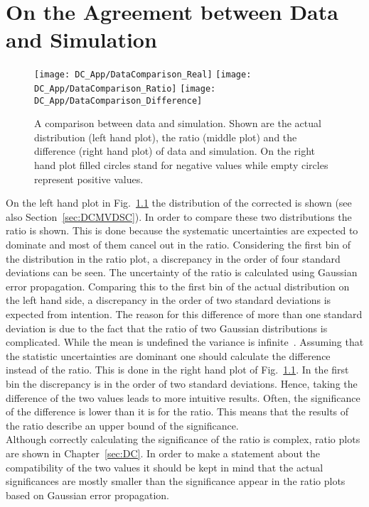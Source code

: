 \chapter{On the Agreement between Data and Simulation \label{sec:DCPvalue}}

\begin{figure}[!h]
  \centering
  \texttt{[image: DC\_App/DataComparison\_Real]}
  \texttt{[image: DC\_App/DataComparison\_Ratio]}
  \texttt{[image: DC\_App/DataComparison\_Difference]}
\caption[Comparison between data and simulation: Actual distributions, ratio and difference]{A comparison between data and simulation. Shown are the actual distribution (left hand plot), the ratio (middle plot) and the difference (right hand plot) of data and simulation. On the right hand plot filled circles stand for negative values while empty circles represent positive values. \label{plot:DCPvalue}}
\end{figure}

On the left hand plot in Fig.~\ref{plot:DCPvalue} the distribution of the corrected \MET{} is shown (see also Section~\ref{sec:DCMVDSC}). In order to compare these two distributions the ratio is shown. This is done because the systematic uncertainties are expected to dominate and most of them cancel out in the ratio. Considering the first bin of the distribution in the ratio plot, a discrepancy in the order of four standard deviations can be seen. The uncertainty of the ratio is calculated using Gaussian error propagation. Comparing this to the first bin of the actual distribution on the left hand side, a discrepancy in the order of two standard deviations is expected from intention. The reason for this difference of more than one standard deviation is due to the fact that the ratio of two Gaussian distributions is complicated. While the mean is undefined the variance is infinite~\cite{ratioMail}. Assuming that the statistic uncertainties are dominant one should calculate the difference instead of the ratio. This is done in the right hand plot of Fig.~\ref{plot:DCPvalue}. In the first bin the discrepancy is in the order of two standard deviations. Hence, taking the difference of the two values leads to more intuitive results. Often, the significance of the difference is lower than it is for the ratio. This means that the results of the ratio describe an upper bound of the significance. \\
Although correctly calculating the significance of the ratio is complex, ratio plots are shown in Chapter~\ref{sec:DC}. In order to make a statement about the compatibility of the two values it should be kept in mind that the actual significances are mostly smaller than the significance appear in the ratio plots based on Gaussian error propagation.
